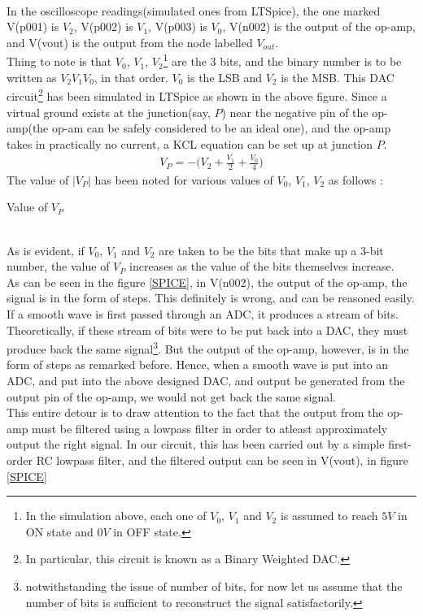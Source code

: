 \documentclass[oneside]{book}
\begin{document}
In the oscilloscope readings(simulated ones from LTSpice\textsuperscript{\textregistered}),  the one marked V(p001) is $V_2$,  V(p002) is $V_1$, V(p003) is $V_0$, V(n002) is the output of the op-amp, and V(vout) is the output from the node labelled $V_{out}$.\\
Thing to note is that $V_0$, $V_1$, $V_2$\footnote{In the simulation above, each one of $V_0$, $V_1$ and $V_2$ is assumed to reach $5V$ in ON state and $0V $ in OFF state.} are the 3 bits, and the binary number is to be written as $V_2V_1V_0$, in that order. $V_0$ is the LSB and $V_2$ is the MSB. This DAC circuit\footnote{In particular, this circuit is known as a Binary Weighted DAC.} has been simulated in LTSpice\textsuperscript{\textregistered} as shown in the above figure.
Since a virtual ground exists at the junction(say, $P$) near the negative pin of the op-amp(the op-am can be safely considered to be an ideal one), and the op-amp takes in practically no current, a KCL equation can be set up at junction $P$.
\begin{align}
    V_{P} = -\biggl ( V_2 + \frac{V_1}{2} + \frac{V_0}{4} \biggr)
\end{align}
The value of $|V_P|$ has been noted for various values of $V_0$, $V_1$, $V_2$ as follows : 
\begin{table}[ht]
\centering

\caption{Value of $V_P$}
\end{table} \\
\bigskip
As is evident, if $V_0$, $V_1$ and $V_2$ are taken to be the bits that make up a 3-bit number, the value of $V_P$ increases as the value of the bits themselves increase. \\
\bigskip
\newpage
As can be seen in the figure \autoref{SPICE}, in V(n002), the output of the op-amp, the signal is in the form of steps. This definitely is wrong, and can be reasoned easily. If a smooth wave is first passed through an ADC, it produces a stream of bits. Theoretically, if these stream of bits were to be put back into a DAC, they must produce back the same signal\footnote{notwithstanding the issue of number of bits, for now let us assume that the number of bits is sufficient to reconstruct the signal satisfactorily.}. But the output of the op-amp, however, is in the form of steps as remarked before. Hence, when a smooth wave is put into an ADC, and put into the above designed DAC, and output be generated from the output pin of the op-amp, we would not get back the same signal. \\ \bigskip
This entire detour is to draw attention to the fact that the output from the op-amp must be filtered using a lowpass filter in order to atleast approximately output the right signal. In our circuit, this has been carried out by a simple first-order RC lowpass filter, and the filtered output can be seen in V(vout), in figure \autoref{SPICE}  
\end{document}
